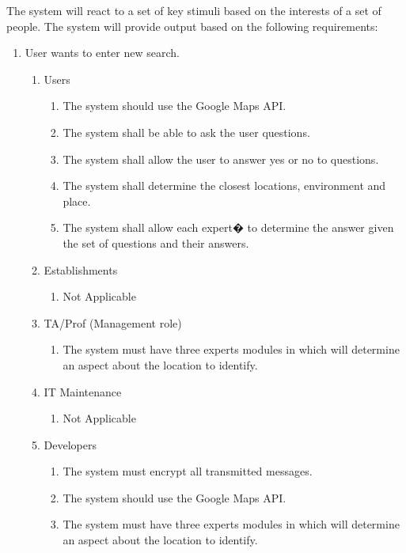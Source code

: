 \documentclass[titlepage]{article}
\newcounter{req}
\begin{document}
		The system will react to a set of key stimuli based on the interests of a set of people. The system will provide output based on the following requirements:
		
		\begin{enumerate}[{BE1}]
			
			\item User wants to enter new search.
			\begin{enumerate}[{VP1.1}]
				
				\item Users
				\begin{enumerate}
					\item The system should use the Google Maps API.
					\item The system shall be able to ask the user questions.
					\item The system shall allow the user to answer yes or no to questions.
					\item The system shall determine the closest locations, environment and place.
					\item The system shall allow each expert� to determine the answer given the set of questions and their answers.
				\end{enumerate}
				
				\item Establishments
				\begin{enumerate}
					\item Not Applicable
				\end{enumerate}
				
				\item TA/Prof (Management role)
				\begin{enumerate}
					\item The system must have three experts modules in which will determine an aspect about the location to identify.
				\end{enumerate}
				
				\item IT Maintenance
				\begin{enumerate}
					\item Not Applicable
				\end{enumerate}
				
				\item Developers
				\begin{enumerate}
					\item The system must encrypt all transmitted messages.
					\item The system should use the Google Maps API.
					\item The system must have three experts modules in which will determine an aspect about the location to identify.
				\end{enumerate}
			\end{enumerate}
			

\end{enumerate}
\end{document}
